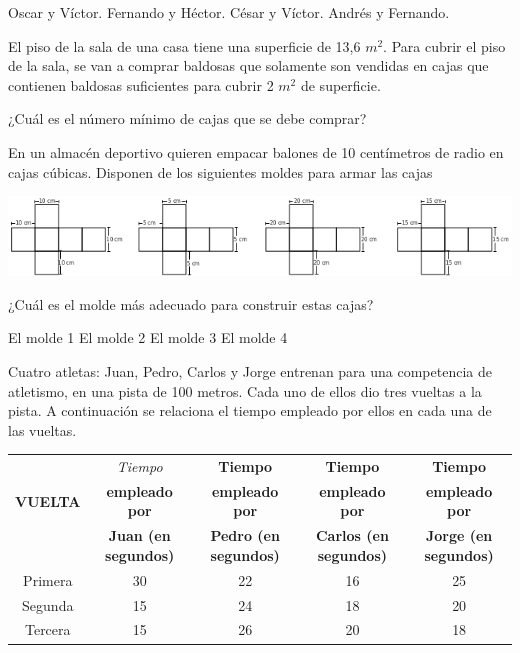 \documentclass[10pt,letterpaper,addpoints]{exam}
\begin{document}
\begin{questions}
\begin{oneparchoices}
\choice Oscar y Víctor.
\choice Fernando y Héctor.
\CorrectChoice César y Víctor.
\choice Andrés y Fernando.
\end{oneparchoices}
\question El piso de la sala de una casa tiene una superficie de 13,6 $m^{2}$. Para cubrir el piso de la sala, se van a comprar baldosas que solamente son vendidas en cajas que contienen baldosas suficientes para cubrir 2 $m^2$ de superficie.

¿Cuál es el número mínimo de cajas que se debe comprar?

\begin{oneparchoices}
\end{oneparchoices}
\question En un almacén deportivo quieren empacar balones de 10 centímetros de radio en cajas cúbicas. Disponen de los siguientes moldes para armar las cajas
\begin{center}
\includegraphics[scale=.75]{Images/moldes.png} 
\end{center}
¿Cuál es el molde más adecuado para construir estas cajas?

\begin{oneparchoices}
\choice El molde 1
\choice El molde 2
\CorrectChoice El molde 3
\choice El molde 4
\end{oneparchoices}
\question Cuatro atletas: Juan, Pedro, Carlos y Jorge entrenan para una competencia de atletismo, en una pista de 100 metros. Cada uno de ellos dio tres vueltas a la pista. A continuación
se relaciona el tiempo empleado por ellos en cada una de las vueltas.
\begin{center}
\begin{tabular}{|c|c|c|c|c|}
\hline 
 & \textit{Tiempo} & \textbf{Tiempo} & \textbf{Tiempo} & \textbf{Tiempo} \\ 
\textbf{VUELTA} & \textbf{empleado por} & \textbf{empleado por} & \textbf{empleado por} & \textbf{empleado por} \\ 
 & \textbf{Juan (en segundos)} & \textbf{Pedro (en segundos)} & \textbf{Carlos (en segundos)} & \textbf{Jorge (en segundos)} \\ 
\hline 
Primera & 30 & 22 & 16 & 25 \\ 
\hline 
Segunda & 15 & 24 & 18 & 20 \\ 
\hline 
Tercera & 15 & 26 & 20 & 18 \\ 
\hline 
\end{tabular} 
\end{center}
\end{questions}
\end{document}
